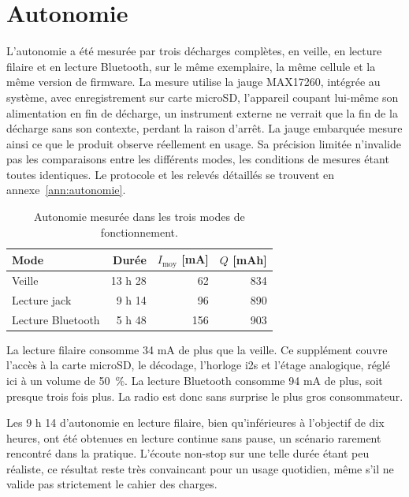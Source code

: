 \section{Autonomie}
\label{sec:res_autonomie}

L'autonomie a été mesurée par trois décharges complètes, en veille, en lecture filaire et en lecture Bluetooth, sur le même exemplaire, la même cellule et la même version de firmware. La mesure utilise la jauge MAX17260, intégrée au système, avec enregistrement sur carte microSD, l'appareil coupant lui-même son alimentation en fin de décharge, un instrument externe ne verrait que la fin de la décharge sans son contexte, perdant la raison d'arrêt. La jauge embarquée mesure ainsi ce que le produit observe réellement en usage. Sa précision limitée n'invalide pas les comparaisons entre les différents modes, les conditions de mesures étant toutes identiques. Le protocole et les relevés détaillés se trouvent en annexe~\ref{ann:autonomie}.

\begin{table}[H]
    \centering
    \renewcommand{\arraystretch}{1.25}
    \caption{Autonomie mesurée dans les trois modes de fonctionnement.}
    \label{tab:res_autonomie}
    \footnotesize
    \begin{tabular}{lrrr}
        \toprule
        Mode              & Durée   & $I_\text{moy}$ [mA] & $Q$ [mAh] \\
        \midrule
        Veille            & 13 h 28 & 62                  & 834       \\
        Lecture jack      & 9 h 14  & 96                  & 890       \\
        Lecture Bluetooth & 5 h 48  & 156                 & 903       \\
        \bottomrule
    \end{tabular}
\end{table}

La lecture filaire consomme 34 mA de plus que la veille. Ce supplément couvre l'accès à la carte microSD, le décodage, l'horloge \gls{i2s} et l'étage analogique, réglé ici à un volume de 50~\%. La lecture Bluetooth consomme 94 mA de plus, soit presque trois fois plus. La radio est donc sans surprise le plus gros consommateur.

Les 9 h 14 d'autonomie en lecture filaire, bien qu'inférieures à l'objectif de dix heures, ont été obtenues en lecture continue sans pause, un scénario rarement rencontré dans la pratique. L'écoute non-stop sur une telle durée étant peu réaliste, ce résultat reste très convaincant pour un usage quotidien, même s'il ne valide pas strictement le cahier des charges.

